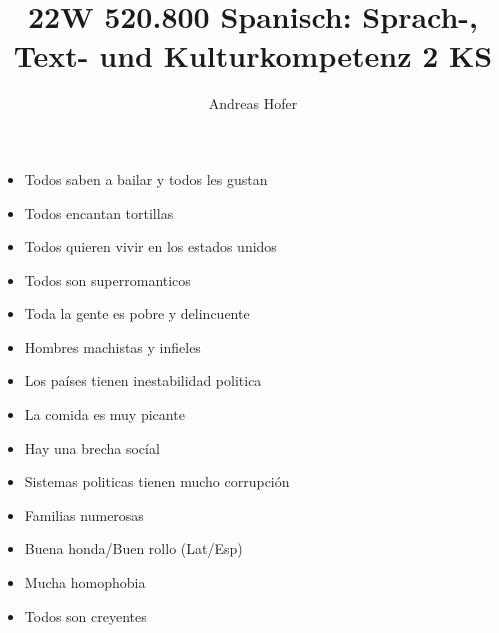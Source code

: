\documentclass{article}
\title{\vspace{-3cm}22W 520.800 Spanisch: Sprach-, Text- und Kulturkompetenz 2 KS}
\author{Andreas Hofer}
\begin{document}
	\begin{itemize}
		\item{Todos saben a bailar y todos les gustan}
		\item{Todos encantan tortillas}
		\item{Todos quieren vivir en los estados unidos}
		\item{Todos son superromanticos}
		\item{Toda la gente es pobre y delincuente}
		\item{Hombres machistas y infieles}
		\item{Los países tienen inestabilidad politica}
		\item{La comida es muy picante}
		\item{Hay una brecha socíal}
		\item{Sistemas politicas tienen mucho corrupción}
		\item{Familias numerosas}
		\item{Buena honda/Buen rollo (Lat/Esp)}
		\item{Mucha homophobia}
		\item{Todos son creyentes}
	\end{itemize}
	
\end{document}
